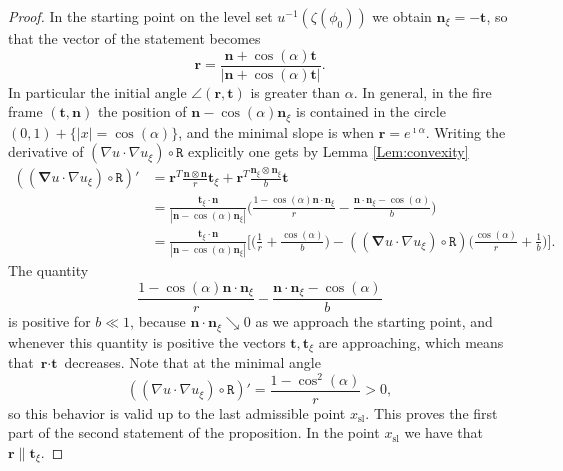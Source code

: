 \documentclass[reqno]{amsart}
\theoremstyle{definition} \newtheorem{definition}{Definition}[section]
\theoremstyle{definition} \newtheorem{remark}[definition]{Remark}
\theoremstyle{plain} \newtheorem{lemma}[definition]{Lemma}
\theoremstyle{plain} \newtheorem{proposition}[definition]{Proposition}
\theoremstyle{plain} \newtheorem{theorem}[definition]{Theorem}
\theoremstyle{plain} \newtheorem{corollary}[definition]{Corollary}
\theoremstyle{definition} \newtheorem{example}[definition]{Example}
\theoremstyle{plain} \newtheorem{claim}[clai]{Claim}
\theoremstyle{definition} \newtheorem{assumption}[definition]{Assumption}
\theoremstyle{definition} \newtheorem{observation}[definition]{Observation}
\newcommand{\n}{\mathbf n}
\newcommand{\1}{\mathbbm 1}
\renewcommand{\i}{\imath}
\numberwithin{equation}{section} %
\theoremstyle{plain} \newtheorem*{theorem*}{Theorem}
\theoremstyle{plain} \newtheorem{mthm}[maintheorem]{Main Theorem}
\theoremstyle{plain} \newtheorem*{mthm*}{Main Theorem}
\theoremstyle{plain} \newtheorem*{conjecture*}{Conjecture}
\theoremstyle{plain} \newtheorem{conjecture}[definition]{Conjecture}
\theoremstyle{plain} \newtheorem*{problem*}{Problem}
\begin{document}
\begin{proof}
In the starting point on the level set $u^{-1}(\zeta({\phi_0}))$ we obtain $\mathbf n_\xi = - \mathbf t$, so that the vector of the statement becomes
\begin{equation*}
\mathbf r = \frac{\mathbf n + \cos(\alpha) \mathbf t}{|\mathbf n + \cos(\alpha) \mathbf t|}.
\end{equation*}
In particular the initial angle $\angle (\mathbf{r},\mathbf{t})$ is greater than $\alpha$. In general, in the fire frame $(\mathbf t,\mathbf n)$ the position of $\mathbf n - \cos(\alpha) \mathbf n_\xi$ is contained in the circle $(0,1) + \{|x| = \cos(\alpha)\}$, and the minimal slope is when $\mathbf r = e^{\i \alpha}$. Writing the derivative of $(\nabla u \cdot \nabla u_\xi) \circ \mathtt R$ explicitly one gets by Lemma \ref{Lem:convexity}
\begin{equation*}
\begin{split}
((\mathbf \nabla u \cdot \nabla u_\xi) \circ \mathtt {R})' &= \mathbf r^T \frac{\mathbf n \otimes \mathbf n}{r} \mathbf t_\xi + \mathbf r^T \frac{\mathbf n_\xi \otimes \mathbf n_\xi}{b} \mathbf t \\
&= \frac{\mathbf t_\xi \cdot \mathbf n}{|\mathbf n - \cos(\alpha) \mathbf n_\xi|} \bigg( \frac{1 - \cos(\alpha) \mathbf n \cdot \mathbf n_\xi}{r} - \frac{\mathbf n \cdot \mathbf n_\xi - \cos(\alpha)}{b} \bigg) \\
&= \frac{\mathbf t_\xi \cdot \mathbf n}{|\mathbf n - \cos(\alpha) \mathbf n_\xi|} \bigg[ \bigg( \frac{1}{r} + \frac{\cos(\alpha)}{b} \bigg) - ((\mathbf \nabla u \cdot \nabla u_\xi) \circ \mathtt {R}) \bigg( \frac{\cos(\alpha)}{r} + \frac{1}{b} \bigg) \bigg].
\end{split}
\end{equation*}
The quantity
\begin{equation*}
\frac{1 - \cos(\alpha) \mathbf n \cdot \mathbf n_\xi}{r} - \frac{\mathbf n \cdot \mathbf n_\xi - \cos(\alpha)}{b}
\end{equation*}
is positive for $b \ll 1$, because $\n \cdot \n_\xi \searrow 0$ as we approach the starting point, and whenever this quantity is positive the vectors $\mathbf t,\mathbf t_\xi$ are approaching, which means that $\textbf{r} \cdot \textbf{t}$ decreases. Note that at the minimal angle
\begin{equation*}
((\nabla u \cdot \nabla u_\xi) \circ \mathtt R)' = \frac{1 - \cos^2(\alpha)}{r} > 0,
\end{equation*}
so this behavior is valid up to the last admissible point $x_\mathrm{sl}$. This proves the first part of the second statement of the proposition. In the point $x_\mathrm{sl}$ we have that $\mathbf{r}\parallel\mathbf{t}_{\xi}$. 


\end{proof}
\end{document}
